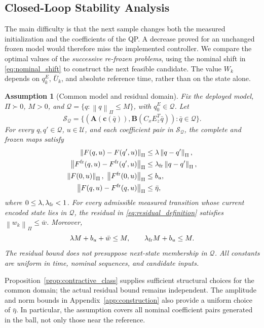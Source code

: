 \documentclass[journal]{IEEEtran}
\newtheorem{assumption}{Assumption}
\newcommand{\vc}{\mathbf{c}}
\newcommand{\mA}{\mathbf{A}}
\newcommand{\mB}{\mathbf{B}}
\newcommand{\norm}[1]{\left\lVert #1\right\rVert}
\begin{document}
\subsection{Closed-Loop Stability Analysis}
\label{subsec:closed_loop}
The main difficulty is that the next sample changes both the measured initialization and the coefficients of the QP. A decrease proved for an unchanged frozen model would therefore miss the implemented controller. We compare the optimal values of the \emph{successive re-frozen problems}, using the nominal shift in \eqref{eq:nominal_shift} to construct the next feasible candidate. The value $W_k$ depends on $q_k^E$, $\bar U_k$, and absolute reference time, rather than on the state alone.

\begin{assumption}[Common model and residual domain]
\label{ass:domain}
Fix the deployed model, $\Pi\succ0$, $M>0$, and $\mathcal Q=\{q:\norm{q}_\Pi\le M\}$, with $q_0^E\in\mathcal Q$. Let
\begin{equation}
\mathcal S_{\mathcal Q}=\{(\mA(\vc(\bar q)),\mB(C_xE_z^T\bar q)):
\bar q\in\mathcal Q\}.
\label{eq:frozen_family}
\end{equation}
For every $q,q'\in\mathcal Q$, $u\in\mathcal U$, and each coefficient pair in $\mathcal S_{\mathcal Q}$, the complete and frozen maps satisfy
\begin{align}
\norm{F(q,u)-F(q',u)}_\Pi&\le\lambda\norm{q-q'}_\Pi,\nonumber\\
\norm{F^{\rm fr}(q,u)-F^{\rm fr}(q',u)}_\Pi
&\le\lambda_{\rm fr}\norm{q-q'}_\Pi,\label{eq:common_contraction}\\
\norm{F(0,u)}_\Pi,\ \norm{F^{\rm fr}(0,u)}_\Pi&\le b_u,\nonumber\\
\norm{F(q,u)-F^{\rm fr}(q,u)}_\Pi&\le\bar\eta,\nonumber
\end{align}
where $0\le\lambda,\lambda_{\rm fr}<1$. For every admissible measured transition whose current encoded state lies in $\mathcal Q$, the residual in \eqref{eq:residual_definition} satisfies $\norm{w_k}_\Pi\le\bar w$. Moreover,
\begin{equation}
\lambda M+b_u+\bar w\le M,\qquad
\lambda_{\rm fr}M+b_u\le M.
\label{eq:domain_radius}
\end{equation}
The residual bound does not presuppose next-state membership in $\mathcal Q$. All constants are uniform in time, nominal sequences, and candidate inputs.
\end{assumption}

Proposition~\ref{prop:contractive_class} supplies sufficient structural choices for the common domain; the actual residual bound remains independent. The amplitude and norm bounds in Appendix~\ref{app:construction} also provide a uniform choice of $\bar\eta$. In particular, the assumption covers all nominal coefficient pairs generated in the ball, not only those near the reference.
\end{document}
